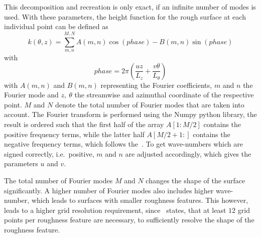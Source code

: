 This decomposition and recreation is only exact, if an infinite number of modes is used.
With these parameters, the height function for the rough surface at each individual point can be defined as
\begin{equation}\label{eq: height function}
    k(\theta,z) = \sum_{m,n}^{M,N} A(m,n)\cos(phase)- B(m,n)\sin(phase)
\end{equation}
with
\begin{equation}\label{eq: phase equation}
    phase = 2\pi\left(\frac{uz}{L_z} + \frac{v\theta}{L_{\theta}}\right)
\end{equation}
with $A(m,n)$ and $B(m,n)$ representing the Fourier coefficients, $m$ and $n$ the Fourier mode and $z,\ \theta$ the streamwise and azimuthal coordinate of the respective point.
$M$ and $N$ denote the total number of Fourier modes that are taken into account.
The Fourier transform is performed using the Numpy python library, the result is ordered such that the first half of the array $A[1:M/2]$ contains the positive frequency terms, while the latter half $A[M/2+1:]$ contains the negative frequency terms, which follows the~\cite{NumpyFT}.
To get wave-numbers which are signed correctly, i.e.\ positive, $m$ and $n$ are adjusted accordingly, which gives the parameters $u$ and $v$.

The total number of Fourier modes $M$ and $N$ changes the shape of the surface significantly.
A higher number of Fourier modes also includes higher wave-number, which leads to surfaces with smaller roughness features. 
This however, leads to a higher grid resolution requirement, since~\cite{chungPredictingDragRough2021} states, that at least $12$ grid points per roughness feature are necessary, to sufficiently resolve the shape of the roughness feature.

